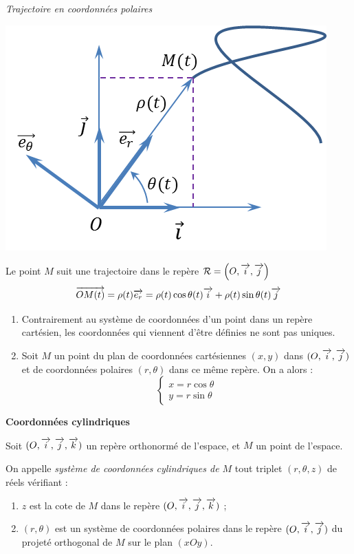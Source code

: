 \documentclass[10pt,oneside]{article}
\begin{document}
\begin{exemple}
\textit{Trajectoire en coordonnées polaires}

\begin{minipage}[c]{.47\linewidth}
\begin{center}
\includegraphics[width=.8\textwidth]{png/coord_polaires}
\end{center}
\end{minipage}\hfill
\begin{minipage}[c]{.47\linewidth}
Le point $M$ suit une trajectoire dans le repère $\mathcal{R}=\left(O, \overrightarrow{i},\overrightarrow{j}\right)$
$$
\overrightarrow{OM(t)}=\rho(t)\overrightarrow{e_r}=\rho(t)\cos \theta(t) \overrightarrow{i} + \rho(t)\sin \theta(t) \overrightarrow{j} 
$$
\end{minipage}

\end{exemple}

\begin{rem}
\begin{enumerate}
\item Contrairement au système de coordonnées d'un point dans un repère cartésien, les coordonnées qui viennent d'être définies ne sont pas uniques. 
\item Soit $M$ un point du plan de coordonnées cartésiennes $(x,y)$ dans $(O,\overrightarrow{i},\overrightarrow{j})$ et de coordonnées polaires $(r,\theta)$ dans ce même repère. On a alors : 
$$
\left\{
\begin{array}{l}
x = r\cos \theta \\
y = r\sin \theta
\end{array}
\right.
$$
\end{enumerate}
\end{rem}

\begin{defi}
\textbf{Coordonnées cylindriques}

Soit $(O, \overrightarrow{i}, \overrightarrow{j}, \overrightarrow{k})$ un repère orthonormé de l'espace, et $M$ un point de l'espace.

On appelle \emph{système de coordonnées cylindriques de $M$} tout triplet $(r,\theta,z)$ de réels vérifiant :
	\begin{enumerate}
	\item $z$ est la cote de $M$ dans le repère $(O, \overrightarrow{i}, \overrightarrow{j}, \overrightarrow{k})$ ;
	\item $(r,\theta)$ est un système de coordonnées polaires dans le repère $(O, \overrightarrow{i}, \overrightarrow{j})$ du projeté orthogonal de $M$ sur le plan $(xOy)$.
	\end{enumerate}
\end{defi}
\end{document}
